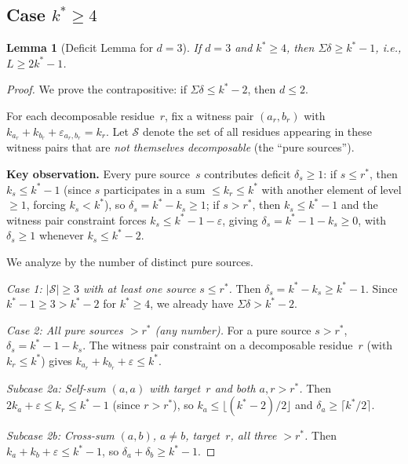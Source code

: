 \documentclass[11pt]{amsart}
\newtheorem{lemma}[theorem]{Lemma}
\theoremstyle{definition}
\theoremstyle{remark}
\begin{document}
\subsection{Case $k^* \ge 4$}

\begin{lemma}[Deficit Lemma for $d = 3$]\label{lem:deficit-d3}
If $d = 3$ and $k^* \ge 4$, then $\Sigma\delta \ge k^* - 1$,
i.e., $L \ge 2k^* - 1$.
\end{lemma}

\begin{proof}
We prove the contrapositive: if $\Sigma\delta \le k^* - 2$, then $d \le 2$.

For each decomposable residue~$r$, fix a witness pair $(a_r, b_r)$
with $k_{a_r} + k_{b_r} + \varepsilon_{a_r, b_r} = k_r$.
Let $\mathcal{S}$ denote the set of all residues appearing in these
witness pairs that are \emph{not themselves decomposable}
(the ``pure sources'').

\medskip
\textbf{Key observation.}
Every pure source~$s$ contributes deficit $\delta_s \ge 1$: if $s \le r^*$,
then $k_s \le k^* - 1$ (since $s$ participates in a sum $\le k_r \le k^*$
with another element of level $\ge 1$, forcing $k_s < k^*$), so
$\delta_s = k^* - k_s \ge 1$; if $s > r^*$, then $k_s \le k^* - 1$
and the witness pair constraint forces $k_s \le k^* - 1 - \varepsilon$,
giving $\delta_s = k^* - 1 - k_s \ge 0$, with $\delta_s \ge 1$
whenever $k_s \le k^* - 2$.

We analyze by the number of distinct pure sources.

\medskip
\emph{Case 1: $|\mathcal{S}| \ge 3$ with at least one source $s \le r^*$.}
Then $\delta_s = k^* - k_s \ge k^* - 1$.  Since $k^* - 1 \ge 3 > k^* - 2$
for $k^* \ge 4$, we already have $\Sigma\delta > k^* - 2$.

\medskip
\emph{Case 2: All pure sources $> r^*$ (any number).}
For a pure source $s > r^*$, $\delta_s = k^* - 1 - k_s$.
The witness pair constraint on a decomposable residue~$r$ (with $k_r \le k^*$)
gives $k_{a_r} + k_{b_r} + \varepsilon \le k^*$.

\emph{Subcase 2a: Self-sum $(a, a)$ with target~$r$ and both $a, r > r^*$.}
Then $2k_a + \varepsilon \le k_r \le k^* - 1$ (since $r > r^*$),
so $k_a \le \lfloor(k^* - 2)/2\rfloor$ and
$\delta_a \ge \lceil k^*/2 \rceil$.

\emph{Subcase 2b: Cross-sum $(a, b)$, $a \ne b$, target~$r$, all three $> r^*$.}
Then $k_a + k_b + \varepsilon \le k^* - 1$, so $\delta_a + \delta_b \ge k^* - 1$.


\end{proof}
\end{document}
